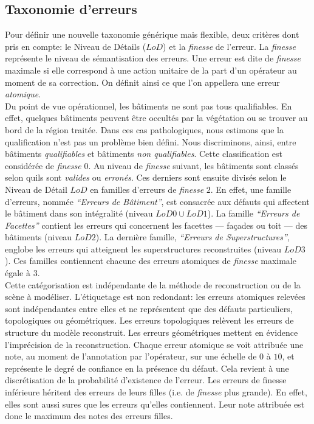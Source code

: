 \documentclass[a4paper,french]{article}
\begin{document}
    \subsection{Taxonomie d'erreurs}

    Pour définir une nouvelle taxonomie générique mais flexible, deux critères dont pris en compte: le Niveau de Détails ($LoD$) et la \emph{finesse} de l'erreur. La \emph{finesse} représente le niveau de sémantisation des erreurs. Une erreur est dite de \emph{finesse} maximale si elle correspond à une action unitaire de la part d'un opérateur au moment de sa correction. On définit ainsi ce que l'on appellera une erreur \emph{atomique}.\\
    Du point de vue opérationnel, les bâtiments ne sont pas tous qualifiables. En effet, quelques bâtiments peuvent être occultés par la végétation ou se trouver au bord de la région traitée. Dans ces cas pathologiques, nous estimons que la qualification n'est pas un problème bien défini. Nous discriminons, ainsi, entre bâtiments \emph{qualifiables} et bâtiments \emph{non qualifiables}. Cette classification est considérée de \emph{finesse} $0$. Au niveau de \emph{finesse} suivant, les bâtiments sont classés selon quils sont \emph{valides} ou \emph{erronés}. Ces derniers sont ensuite divisés selon le Niveau de Détail $LoD$ en familles d'erreurs de \emph{finesse} $2$. En effet, une famille d'erreurs, nommée \emph{``Erreurs de Bâtiment''}, est consacrée aux défauts qui affectent le bâtiment dans son intégralité (niveau $LoD 0\cup LoD 1$). La famille \emph{``Erreurs de Facettes''} contient les erreurs qui concernent les facettes --- façades ou toit --- des bâtiments (niveau $LoD 2$). La dernière famille, \emph{``Erreurs de Superstructures''}, englobe les erreurs qui atteignent les superstructures reconstruites (niveau $LoD 3$). Ces familles contiennent chacune des erreurs atomiques de \emph{finesse} maximale égale à $3$.\\
    Cette catégorisation est indépendante de la méthode de reconstruction ou de la scène à modéliser. L'étiquetage est non redondant: les erreurs atomiques relevées sont indépendantes entre elles et ne représentent que des défauts particuliers, topologiques ou géométriques. Les erreurs topologiques relèvent les erreurs de structure du modèle reconstruit. Les erreurs géométriques mettent en évidence l'imprécision de la reconstruction. Chaque erreur atomique se voit attribuée une note, au moment de l'annotation par l'opérateur, sur une échelle de $0$ à $10$, et représente le degré de confiance en la présence du défaut. Cela revient à une discrétisation de la probabilité d'existence de l'erreur. Les erreurs de finesse inférieure héritent des erreurs de leurs filles (i.e. de \emph{finesse} plus grande). En effet, elles sont aussi sures que les erreurs qu'elles contiennent. Leur note attribuée est donc le maximum des notes des erreurs filles.
\end{document}
